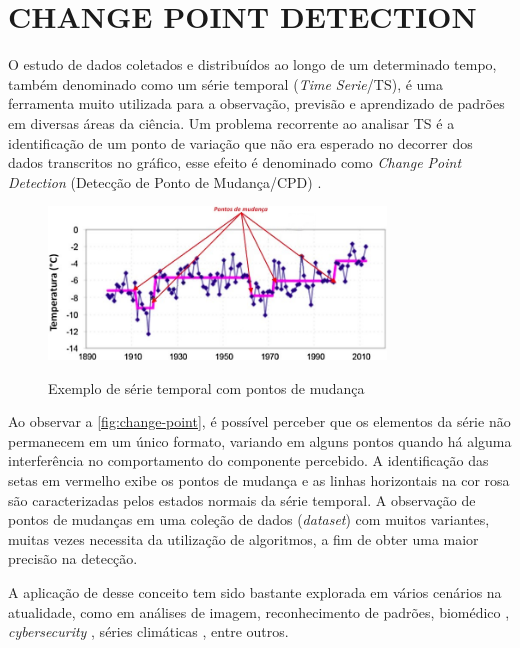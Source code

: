 \section{CHANGE POINT DETECTION}
\label{sec:changePointDetection}

O estudo de dados coletados e distribuídos ao longo de um determinado tempo, também denominado como um série temporal (\textit{Time Serie}/TS), é uma ferramenta muito utilizada para a observação, previsão e aprendizado de padrões em diversas áreas da ciência. Um problema recorrente ao analisar TS é a identificação de um ponto de variação que não era esperado no decorrer dos dados transcritos no gráfico, esse efeito é denominado como \textit{Change Point Detection} (Detecção de Ponto de Mudança/CPD) \cite{Aminikhanghahi2017}.

\begin{figure}[!htb]
    \centering
    \caption{Exemplo de série temporal com pontos de mudança}
    \includegraphics[width=0.8\textwidth]{./dados/figuras/pontos-de-mudanca}
    \label{fig:change-point}
\end{figure}

Ao observar a \autoref{fig:change-point}, é possível perceber que os elementos da série não permanecem em um único formato, variando em alguns pontos quando há alguma interferência no comportamento do componente percebido. A identificação das setas em vermelho exibe os pontos de mudança e as linhas horizontais na cor rosa são caracterizadas pelos estados normais da série temporal. A observação de pontos de mudanças em uma coleção de dados (\textit{dataset}) com muitos variantes, muitas vezes necessita da utilização de algoritmos, a fim de obter uma maior precisão na detecção. 

A aplicação de desse conceito tem sido bastante explorada em vários cenários na atualidade, como em análises de imagem, reconhecimento de padrões, biomédico \cite{Fan2015}, \textit{cybersecurity} \cite{Polunchenko2012}, séries climáticas \cite{Bates2012}, entre outros. 

